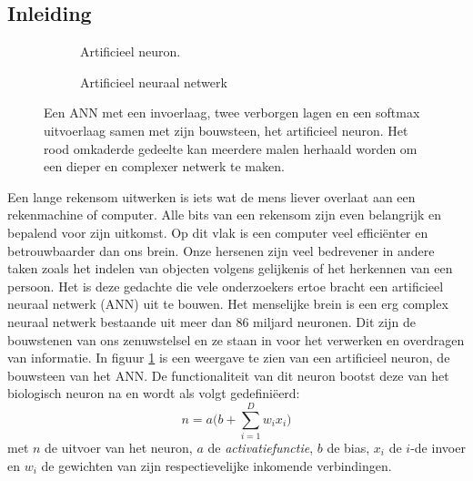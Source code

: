 \subsection{Inleiding}
\begin{figure}
	\centering
	\begin{subfigure}{.5\textwidth}
		\centering
		
		\caption{Artificieel neuron.}
		\label{fig:neuron}
	\end{subfigure}%
	\begin{subfigure}{.5\textwidth}
		\centering
		
		\caption{Artificieel neuraal netwerk}
		\label{fig:ANN}
	\end{subfigure}
	\caption{Een ANN met een invoerlaag, twee verborgen lagen en een softmax uitvoerlaag samen met zijn bouwsteen, het artificieel neuron. Het rood omkaderde gedeelte kan meerdere malen herhaald worden om een dieper en complexer netwerk te maken.}
	\label{fig:test}
\end{figure}
Een lange rekensom uitwerken is iets wat de mens liever overlaat aan een rekenmachine of computer. Alle bits van een rekensom zijn even belangrijk en bepalend voor zijn uitkomst. Op dit vlak is een computer veel effici\"enter en betrouwbaarder dan ons brein. Onze hersenen zijn veel bedrevener in andere taken zoals het indelen van objecten volgens gelijkenis of het herkennen van een persoon.
\npar Het is deze gedachte die vele onderzoekers ertoe bracht een artificieel neuraal netwerk (ANN) uit te bouwen. Het menselijke brein is een erg complex neuraal netwerk bestaande uit meer dan 86 miljard neuronen. Dit zijn de bouwstenen van ons zenuwstelsel en ze staan in voor het verwerken en overdragen van informatie. In figuur \ref{fig:neuron} is een weergave te zien van een artificieel neuron, de bouwsteen van het ANN. De functionaliteit van dit neuron bootst deze van het biologisch neuron na en wordt als volgt gedefini\"eerd:
\begin{equation}\label{eq:neuron}
n = a\bigg(b+\sum_{i=1}^{D}w_ix_i\bigg)
\end{equation}
met $n$ de uitvoer van het neuron, $a$ de \textit{activatiefunctie}, $b$ de bias, $x_i$ de $i$-de invoer en $w_i$ de gewichten van zijn respectievelijke inkomende verbindingen.



